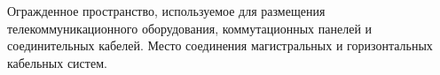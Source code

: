 Огражденное пространство, используемое для размещения
телекоммуникационного оборудования, коммутационных 
панелей и соединительных кабелей. Место соединения 
магистральных и горизонтальных кабельных систем.